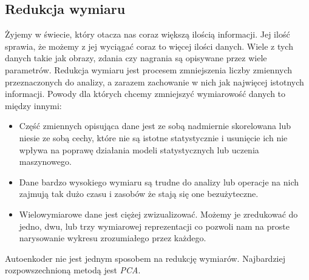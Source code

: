 \documentclass[a4paper,12pt]{book} %
\begin{document}
\subsection{Redukcja wymiaru}
Żyjemy w świecie, który otacza nas coraz większą ilością informacji. Jej ilość sprawia, że możemy z jej wyciągać coraz to więcej ilości danych. Wiele z tych danych takie jak obrazy, zdania czy nagrania są opisywane przez wiele parametrów. Redukcja wymiaru jest procesem zmniejszenia liczby zmiennych przeznaczonych do analizy, a zarazem zachowanie w nich jak najwięcej istotnych informacji. Powody dla których chcemy zmniejszyć wymiarowość danych to między innymi:
\begin{itemize}
	\item Część zmiennych opisująca dane jest ze sobą nadmiernie skorelowana lub niesie ze sobą cechy, które nie są istotne statystycznie i usunięcie ich nie wpływa na poprawę działania modeli statystycznych lub uczenia maszynowego.
	\item Dane bardzo wysokiego wymiaru są trudne do analizy lub operacje na nich zajmują tak dużo czasu i zasobów że stają się one bezużyteczne. 
	\item Wielowymiarowe dane jest ciężej zwizualizować. Możemy je zredukować do jedno, dwu, lub trzy wymiarowej reprezentacji co pozwoli nam na proste narysowanie wykresu zrozumiałego przez każdego.
\end{itemize}
Autoenkoder nie jest jednym sposobem na redukcję wymiarów. Najbardziej rozpowszechnioną metodą jest \textit{PCA}. 
\end{document}

